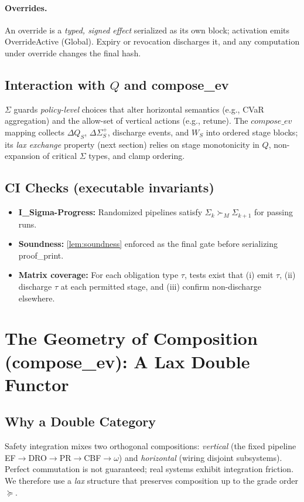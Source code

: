 \documentclass[11pt]{article}
\theoremstyle{plain}
\theoremstyle{definition}
\theoremstyle{remark}
\def\Q{Q}%
\def\Sig{\Sigma}%
\def\composeev{compose\_ev}%
\def\code#1{#1}%
\def\ISigma{I\_Sigma-Progress}%
\DeclareRobustCommand{\Q}{\texorpdfstring{\ensuremath{\mathcal{Q}}}{Q}}     %
\DeclareRobustCommand{\Sig}{\texorpdfstring{\ensuremath{\Sigma}}{\Sigma}}   %
\DeclareMathOperator{\composeevOp}{compose\_ev}
\DeclareRobustCommand{\composeev}{\texorpdfstring{\ensuremath{\composeevOp}}{compose\_ev}}
\newcommand{\geqQ}{\succeq}
\newcommand{\code}[1]{\texttt{\textup{#1}}}    %
\newcommand{\EF}{\textsc{EF}}
\newcommand{\DRO}{\textsc{DRO}}
\newcommand{\PR}{\textsc{PR}}
\newcommand{\CBF}{\textsc{CBF}}
\newcommand{\om}{\ensuremath{\omega}}
\DeclareRobustCommand{\ISigma}{%
  \texorpdfstring{\textsc{I\_\ensuremath{\Sigma}-Progress}}{\textsc{I\_Sigma-Progress}}%
}
\def\Q{Q}%
\def\Sig{\Sigma}%
\def\composeev{compose\_ev}%
\def\code#1{#1}%
\begin{document}
\paragraph{Overrides.} An override is a \emph{typed, signed effect} serialized as its own block; activation emits \code{OverrideActive} (Global). Expiry or revocation discharges it, and any computation under override changes the final hash.

\subsection{Interaction with $\Q$ and \composeev}
$\Sig$ guards \emph{policy-level} choices that alter horizontal semantics (e.g., CVaR aggregation) and the allow-set of vertical actions (e.g., retune). The $\composeev$ mapping collects $\Delta\Q_S$, $\Delta\Sigma^{+}_S$, discharge events, and $W_S$ into ordered stage blocks; its \emph{lax exchange} property (next section) relies on stage monotonicity in $\Q$, non-expansion of critical $\Sig$ types, and clamp ordering.

\subsection{CI Checks (executable invariants)}
\begin{itemize}[leftmargin=1.6em]
  \item \textbf{\ISigma:} Randomized pipelines satisfy $\Sigma_k \succ_M \Sigma_{k+1}$ for passing runs.
  \item \textbf{Soundness:} \cref{lem:soundness} enforced as the final gate before serializing \code{proof\_print}.
  \item \textbf{Matrix coverage:} For each obligation type $\tau$, tests exist that (i) emit $\tau$, (ii) discharge $\tau$ at each permitted stage, and (iii) confirm non-discharge elsewhere.
\end{itemize}


\section{The Geometry of Composition (\composeev): A Lax Double Functor}
\label{sec:compose-ev}

\subsection{Why a Double Category}
Safety integration mixes two orthogonal compositions: \emph{vertical} (the fixed pipeline \EF$\!\to$\DRO$\!\to$\PR$\!\to$\CBF$\!\to$\om) and \emph{horizontal} (wiring disjoint subsystems). Perfect commutation is not guaranteed; real systems exhibit integration friction. We therefore use a \emph{lax} structure that preserves composition up to the grade order $\geqQ$.
\end{document}

